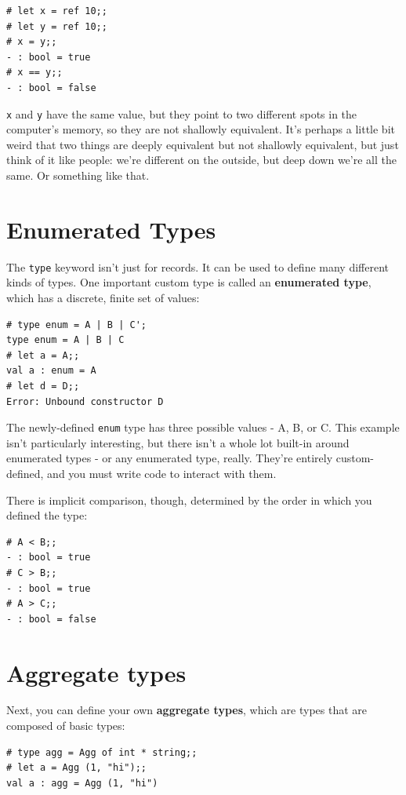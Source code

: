 \documentclass[10pt]{book}
\begin{document}
{\beforeverb
\begin{verbatim}
# let x = ref 10;;
# let y = ref 10;;
# x = y;;
- : bool = true
# x == y;;
- : bool = false
\end{verbatim}
\afterverb

{\tt x} and {\tt y} have the same value, but they point to two different spots in the computer's memory, so they are not shallowly equivalent. It's perhaps a little bit weird that two things are deeply equivalent but not shallowly equivalent, but just think of it like people: we're different on the outside, but deep down we're all the same. Or something like that.

\section{Enumerated Types}

The {\tt type} keyword isn't just for records. It can be used to define many different kinds of types. One important custom type is called an {\bf enumerated type}, which has a discrete, finite set of values:

\beforeverb
\begin{verbatim}
# type enum = A | B | C';
type enum = A | B | C
# let a = A;;
val a : enum = A
# let d = D;;
Error: Unbound constructor D
\end{verbatim}
\afterverb

The newly-defined {\tt enum} type has three possible values - A, B, or C. This example isn't particularly interesting, but there isn't a whole lot built-in around enumerated types - or any enumerated type, really. They're entirely custom-defined, and you must write code to interact with them.

There is implicit comparison, though, determined by the order in which you defined the type:

\beforeverb
\begin{verbatim}
# A < B;;
- : bool = true
# C > B;;
- : bool = true
# A > C;;
- : bool = false
\end{verbatim}
\afterverb

\section{Aggregate types}

Next, you can define your own {\bf aggregate types}, which are types that are composed of basic types:

\beforeverb
\begin{verbatim}
# type agg = Agg of int * string;;
# let a = Agg (1, "hi");;
val a : agg = Agg (1, "hi")
\end{verbatim}
\afterverb

}
\end{document}
